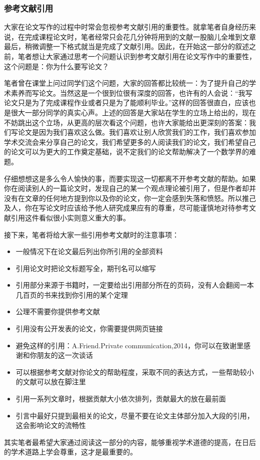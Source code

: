 \documentclass{formatBook}
\begin{document}
\subsubsection{参考文献引用}
大家在论文写作的过程中时常会忽视参考文献引用的重要性。就拿笔者自身经历来说，在完成课程论文时，笔者经常只会花几分钟将用到的文献一股脑儿全堆到文章最后，稍微调整一下格式就当是完成了文献引用。因此，在开始这一部分的叙述之前，笔者想让大家通过思考一个问题认识到参考文献引用在论文写作中的重要性，这个问题是：你为什么要写论文？\par
笔者曾在课堂上问过同学们这个问题，大家的回答都比较统一：为了提升自己的学术素养而写论文。当然这是一个很到位很有深度的回答，也许有的人会说：“我写论文只是为了完成课程作业或者只是为了能顺利毕业。”这样的回答很直白，应该也是很大一部分同学的真实心声。上述的回答是大家站在学生的立场上给出的，现在不妨跳出这个立场，从更高的层次看这个问题，也许大家能给出更深刻的答案：我们写论文是因为我们喜欢这么做。我们喜欢让别人欣赏我们的工作，我们喜欢参加学术交流会来分享自己的论文，我们希望更多的人阅读我们的论文，我们希望自己的论文可以为更大的工作奠定基础，说不定我们的论文帮助解决了一个数学界的难题。\par
仔细想想这是多么令人愉快的事，而要实现这一切都离不开参考文献的帮助。如果你在阅读别人的一篇论文时，发现自己的某一个观点理论被引用了，但是作者却并没有在文章的任何地方提到你以及你的论文，你一定会感到失落和愤怒。所以推己及人，你在写论文时应该给予他人研究成果应有的尊重，尽可能谨慎地对待参考文献引用这件看似很小实则意义重大的事。\par
接下来，笔者将给大家一些引用参考文献时的注意事项：
\begin{itemize}
    \item 一般情况下在论文最后列出你所引用的全部资料
    \item 引用论文时把论文标题写全，期刊名可以缩写
    \item 引用部分来源于书籍时，一定要给出引用部分所在的页码，没有人会翻阅一本几百页的书来找到你引用的某个定理
    \item 公理不需要你提供参考文献
    \item 引用没有公开发表的论文，你需要提供网页链接
    \item 避免这样的引用：A.Friend.Private communication,2014，你可以在致谢里感谢和你朋友的这一次谈话
    \item 可以根据参考文献对你论文的帮助程度，采取不同的表达方式，一些帮助较小的文献可以放在脚注里
    \item 引用一系列文章时，根据贡献大小依次排列，贡献最大的放在最前面
    \item 引言中最好只提到最相关的论文，尽量不要在论文主体部分加入大段的引用，这会影响论文的流畅性
\end{itemize}
\par
其实笔者最希望大家通过阅读这一部分的内容，能够重视学术道德的提高，在日后的学术道路上学会尊重，这才是最重要的。
\end{document}
